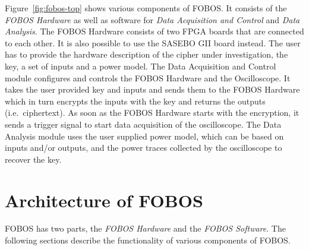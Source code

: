 \documentclass{llncs}
\numberwithin{algorithm}{chapter}
\begin{document}
Figure~\ref{fig:fobos-top} shows various components of FOBOS. It consists of the 
\emph{FOBOS Hardware} as well as software for \emph{Data Acquisition and Control} 
and \emph{Data Analysis}. The FOBOS Hardware consists of two FPGA boards that 
are connected to each other. It is also possible to use the SASEBO GII board instead.
The user has to provide the hardware description of the
cipher under investigation, the key, a set of inputs and a power model. 
The Data Acquisition and Control module configures and controls the 
FOBOS Hardware and the Oscilloscope.  It takes the user provided key and
inputs and sends them to the FOBOS Hardware which in turn encrypts the inputs 
with the key and returns the outputs (i.e.\ ciphertext). As soon as the FOBOS 
Hardware starts with the encryption, it sends a trigger signal to start data
acquisition of the oscilloscope.  The Data Analysis module uses the user 
supplied power model, which can be based on inputs and/or outputs, and the 
power traces collected by the oscilloscope to recover the key. 






\section{Architecture of FOBOS}
FOBOS has two parts, the \emph{FOBOS Hardware} and the \emph{FOBOS Software}. 
The following sections describe the functionality of various components of FOBOS.
\end{document}
